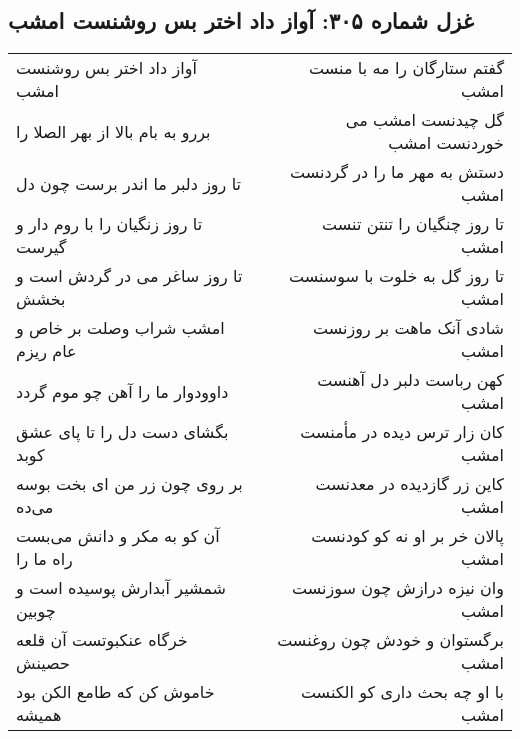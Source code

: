 \begin{center}
\section*{غزل شماره ۳۰۵: آواز داد اختر بس روشنست امشب}
\label{sec:0305}
\begin{longtable}{l p{0.5cm} r}
آواز داد اختر بس روشنست امشب
&&
گفتم ستارگان را مه با منست امشب
\\
بررو به بام بالا از بهر الصلا را
&&
گل چیدنست امشب می خوردنست امشب
\\
تا روز دلبر ما اندر برست چون دل
&&
دستش به مهر ما را در گردنست امشب
\\
تا روز زنگیان را با روم دار و گیرست
&&
تا روز چنگیان را تنتن تنست امشب
\\
تا روز ساغر می در گردش است و بخشش
&&
تا روز گل به خلوت با سوسنست امشب
\\
امشب شراب وصلت بر خاص و عام ریزم
&&
شادی آنک ماهت بر روزنست امشب
\\
داوودوار ما را آهن چو موم گردد
&&
کهن رباست دلبر دل آهنست امشب
\\
بگشای دست دل را تا پای عشق کوبد
&&
کان زار ترس دیده در مأمنست امشب
\\
بر روی چون زر من ای بخت بوسه می‌ده
&&
کاین زر گازدیده در معدنست امشب
\\
آن کو به مکر و دانش می‌بست راه ما را
&&
پالان خر بر او نه کو کودنست امشب
\\
شمشیر آبدارش پوسیده است و چوبین
&&
وان نیزه درازش چون سوزنست امشب
\\
خرگاه عنکبوتست آن قلعه حصینش
&&
برگستوان و خودش چون روغنست امشب
\\
خاموش کن که طامع الکن بود همیشه
&&
با او چه بحث داری کو الکنست امشب
\\
\end{longtable}
\end{center}

